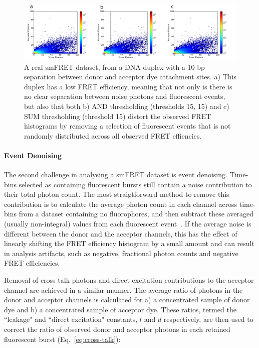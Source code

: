 \begin{figure}
   \begin{center}
      \includegraphics*[clip=true, width=6in]{inference/thresholding_real_low.pdf}
      \caption{A real smFRET dataset, from a DNA duplex with a 10 bp separation between donor and acceptor dye attachment sites. a) This duplex has a low FRET efficiency, meaning that not only is there is no clear separation between noise photons and fluorescent events, but also that both b) AND thresholding (thresholds 15, 15) and c) SUM thresholding (threshold 15) distort the observed FRET histograms by removing a selection of fluorescent events that is not randomly distributed across all observed FRET effiencies.}
      \label{fig:lowFRET}
   \end{center}
\end{figure}

\paragraph{Event Denoising}
The second challenge in analysing a smFRET dataset is event denoising. Time-bins selected as containing fluorescent bursts still contain a noise contribution to their total photon count. The most straigtforward method to remove this contribution is to calculate the average photon count in each channel across time-bins from a dataset containing no fluorophores, and then subtract these averaged (usually non-integral) values from each fluorescent event~\cite{nir06}. If the average noise is different between the donor and the acceptor channels, this has the effect of linearly shifting the FRET efficiency histogram by a small amount and can result in analysis artifacts, such as negative, fractional photon counts and negative FRET efficiencies. 

Removal of cross-talk photons and direct excitation contributions to the acceptor channel are achieved in a similar manner. The average ratio of photons in the donor and acceptor channels is calculated for a) a concentrated sample of donor dye and b) a concentrated sample of acceptor dye. These ratios, termed the ``leakage" and ``direct excitation" constants, $l$ and $d$ respectively, are then used to correct the ratio of observed donor and acceptor photons in each retained fluorescent burst (Eq.~\ref{eq:cross-talk}):

